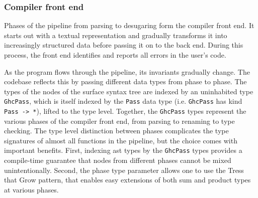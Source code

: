 \documentclass[thesis=B,english]{FITthesis}[2019/12/23]
\newcommand{\hsType}[1]{\texttt{#1}}
\begin{document}
\subsubsection*{Compiler front end}
Phases of the pipeline from parsing to desugaring form the compiler front end.
It starts out with a textual representation and gradually transforms it into
increasingly structured data before passing it on to the back end. During this
process, the front end identifies and reports all errors in the user's code.

As the program flows through the pipeline, its invariants gradually change. The
codebase reflects this by passing different data types from phase to phase. The
types of the nodes of the surface syntax tree are indexed by an uninhabited
type \hsType{GhcPass}, which is itself indexed by the \hsType{Pass} data type
(i.e. \hsType{GhcPass} has kind \hsType{Pass -> *}), lifted to the type level.
Together, the \hsType{GhcPass} types represent the various phases of the
compiler front end, from parsing to renaming to type checking. The type level
distinction between phases complicates the type signatures of almost all
functions in the pipeline, but the choice comes with important benefits.
First, indexing \acrshort{ast} types by the \hsType{GhcPass} types provides a
compile-time guarantee that nodes from different phases cannot be mixed
unintentionally. Second, the phase type parameter allows one to use the Tress
that Grow pattern\cite{trees-that-grow}, that enables easy extensions of both
sum and product types at various phases.
\end{document}
